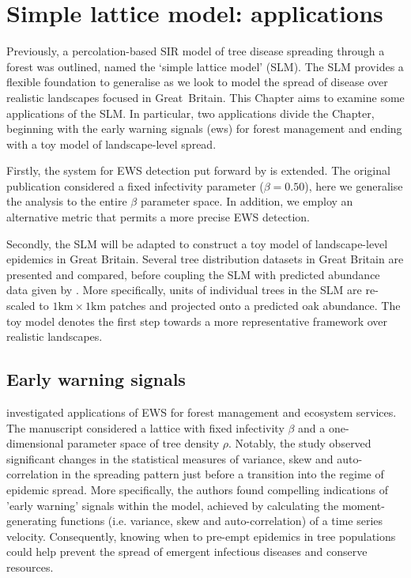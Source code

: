 
\chapter{Simple lattice model: applications}
\label{chapter:SLM-applications}

Previously, a percolation-based SIR model of tree disease spreading through a forest was outlined, named the `simple lattice model' (SLM). The SLM provides a flexible foundation to generalise as we look to model the spread of disease over realistic landscapes focused in Great Britain. This Chapter aims to examine some applications of the SLM. In particular, two applications divide the Chapter, beginning with the early warning signals (\acrshort{ews}) for forest management and ending with a toy model of landscape-level spread.

Firstly, the system for EWS detection put forward by \cite{OROZCOFUENTES201912} is extended. 
The original publication considered a fixed infectivity parameter ($\beta = 0.50$), here we generalise the analysis to the entire $\beta$ parameter space. 
In addition, we employ an alternative metric that permits a more precise EWS detection.

Secondly, the SLM will be adapted to construct a toy model of landscape-level epidemics in Great Britain.
Several tree distribution datasets in Great Britain are presented and compared, before coupling the SLM with predicted abundance data given by \cite{hill.data}. More specifically, units of individual trees in the SLM are re-scaled to $\mathrm{1km \times 1km}$ patches and projected onto a predicted oak abundance. The toy model denotes the first step towards a more representative framework over realistic landscapes.

\section{Early warning signals}
\label{sec:EWS}

\cite{OROZCOFUENTES201912} investigated applications of EWS  for forest management and ecosystem services. The manuscript considered a lattice with fixed infectivity $\beta$ and a one-dimensional parameter space of tree density $\rho$. Notably, the study observed significant changes in the statistical measures of variance, skew and auto-correlation in the spreading pattern just before a transition into the regime of epidemic spread. More specifically, the authors found compelling indications of 'early warning' signals within the model, achieved by calculating the moment-generating functions (i.e. variance, skew and auto-correlation) of a time series velocity. Consequently, knowing when to pre-empt epidemics in tree populations could help prevent the spread of emergent infectious diseases and conserve resources. 


